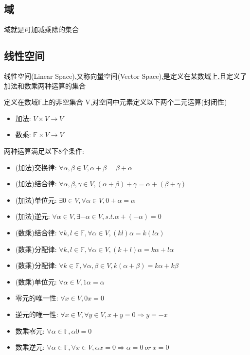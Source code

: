 \subsection{域}
\begin{Chinese Note}
    域就是可加减乘除的集合
\end{Chinese Note}
\subsection{线性空间}
线性空间(Linear Space),又称向量空间(Vector Space),是定义在某数域上,且定义了加法和数乘两种运算的集合
\begin{tcolorbox}
    [colback=Emerald!10,colframe=cyan!40!black,title=\textbf{线性空间}]

    定义在数域$\mathbb{F}$上的非空集合 V,对空间中元素定义以下两个二元运算(封闭性)
    \begin{itemize}
        \item 加法: $V\times V\rightarrow V$
        \item 数乘: $\mathbb{F}\times V\rightarrow V$
    \end{itemize}
    两种运算满足以下8个条件:
    \begin{itemize}
        \item (加法)交换律: $\forall \alpha,\beta\in V,\alpha+\beta=\beta+\alpha$
        \item (加法)结合律: $\forall \alpha,\beta,\gamma\in V,(\alpha+\beta)+\gamma=\alpha+(\beta+\gamma)$
        \item (加法)单位元: $\exists 0\in V,\forall \alpha\in V,0+\alpha=\alpha$
        \item (加法)逆元: $\forall \alpha\in V,\exists -\alpha\in V,s.t.\alpha+(-\alpha)=0$
        \item (数乘)结合律: $\forall k,l\in\mathbb{F},\forall \alpha\in V,(kl)\alpha=k(l \alpha)$
        \item (数乘)分配律: $\forall k,l\in\mathbb{F},\forall \alpha\in V,(k+l)\alpha=k \alpha+l \alpha$
        \item (数乘)分配律: $\forall k\in\mathbb{F},\forall \alpha,\beta\in V,k(\alpha+\beta)=k \alpha+k \beta$
        \item (数乘)单位元: $\forall \alpha\in V,1\alpha=\alpha$
    \end{itemize}
\end{tcolorbox}

\begin{tcolorbox}
    [title = \textbf{线性空间的基本性质}, colback=Salmon!20, colframe=Salmon!90!Black]
    \begin{itemize}
        \item 零元的唯一性: $\forall x\in V,0x=0$
        \item 逆元的唯一性: $\forall x\in V,\forall y\in V,x+y=0\Rightarrow y=-x$
        \item 数乘零元: $\forall \alpha\in\mathbb{F},\alpha 0=0$
        \item 数乘逆元: $\forall \alpha\in\mathbb{F},\forall x\in V,\alpha x=0\Rightarrow \alpha=0\ or\ x=0$
    \end{itemize}
\end{tcolorbox}



